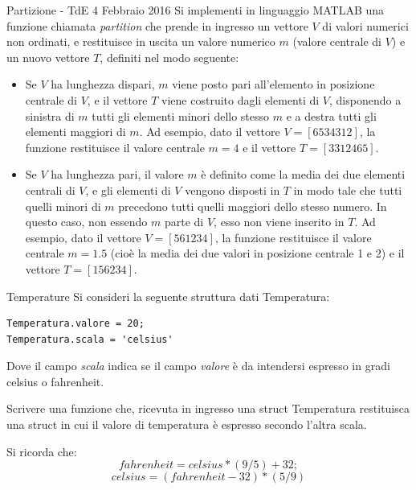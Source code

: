 \documentclass[format=169, 10pt]{beamer}
\begin{document}
\begin{frame}[allowframebreaks]{Partizione - TdE 4 Febbraio 2016}
Si implementi in linguaggio MATLAB una funzione chiamata \emph{partition} che prende in ingresso un  
vettore $V$ di valori numerici non ordinati, e restituisce in uscita un valore numerico $m$ (valore  
centrale di $V$) e un nuovo vettore $T$, definiti nel modo seguente:  

\framebreak

\begin{itemize}
	\item Se $V$ ha lunghezza dispari, $m$ viene posto pari all'elemento in posizione centrale di $V$, e il  
vettore $T$ viene costruito dagli elementi di $V$, disponendo a sinistra di $m$ tutti gli elementi minori  
dello stesso $m$ e a destra tutti gli elementi maggiori di $m$.  
Ad esempio, dato il vettore $V = [6 5 3 4 3 1 2]$, la funzione restituisce il valore centrale $m = 4$ e  
il vettore $T = [ 3 3 1 2 4 6 5]$.  

	\item Se $V$ ha lunghezza pari, il valore $m$ è definito come la media dei due elementi centrali di $V$, e gli  
elementi di $V$ vengono disposti in $T$ in modo tale che tutti quelli minori di $m$ precedono tutti  
quelli maggiori dello stesso numero. In questo caso, non essendo $m$ parte di $V$, esso non viene  
inserito in $T$. 
Ad esempio, dato il vettore $V = [5 6 1 2 3 4]$, la funzione restituisce il valore centrale $m = 1.5$  
(cioè la media dei due valori in posizione centrale 1 e 2) e il vettore $T = [1 5 6 2 3 4]$. 
\end{itemize}
\end{frame}

\begin{frame}[fragile]{Temperature}
Si consideri la seguente struttura dati Temperatura:
\begin{lstlisting}
Temperatura.valore = 20;
Temperatura.scala = 'celsius'
\end{lstlisting}
Dove il campo \emph{scala} indica se il campo \emph{valore} è da intendersi espresso in gradi celsius o fahrenheit.

Scrivere una funzione che, ricevuta in ingresso una struct Temperatura restituisca una struct in cui il valore di temperatura è espresso secondo l'altra scala.

Si ricorda che: \[fahrenheit = celsius * (9/5) + 32;\] 	\[celsius = (fahrenheit -32) * (5/9)\]
\end{frame}
\end{document}
